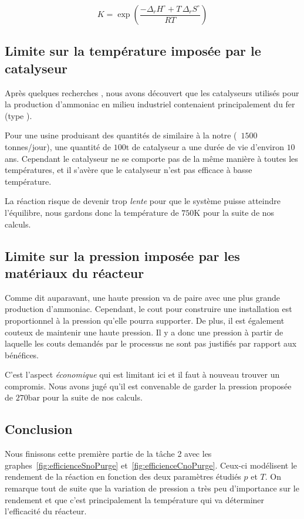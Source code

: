 \[
K = \exp{\left( \frac{- \Delta_r H^{\circ} + T \, \Delta_r S^{\circ}}{R T}\right)}
\]

\subsection{Limite sur la température imposée par le catalyseur}

Après quelques recherches \cite{catalyseur}, 
nous avons découvert que les catalyseurs utilisés
pour la production d'ammoniac en milieu industriel 
contenaient principalement du fer (type ). 

Pour une usine produisant des quantités de  similaire à la notre (~$1500$ tonnes/jour), 
une quantité de $100\si{\tonne}$ de catalyseur a une durée de vie d'environ $10$ ans. 
Cependant le catalyseur ne se comporte pas de la m\^eme manière à toutes les températures,
et il s'avère que le catalyseur n'est pas efficace à basse température. 

La réaction risque de devenir trop \emph{lente} pour que le système puisse
atteindre l'équilibre, nous gardons donc la température de $750\si{\kelvin}$
pour la suite de nos calculs.

\subsection{Limite sur la pression imposée par les matériaux du réacteur}

Comme dit auparavant, une haute pression va de paire avec une plus grande production d'ammoniac.
Cependant, le cout pour construire une installation est proportionnel 
à la pression qu'elle pourra supporter. 
De plus, il est également couteux de maintenir une haute pression. 
Il y a donc une pression à partir de laquelle les couts demandés 
par le processus ne sont pas justifiés par rapport aux bénéfices. 

C'est l'aspect \emph{économique} qui est limitant ici et il faut à nouveau trouver un compromis.
Nous avons jugé qu'il est convenable de garder la pression proposée de $270\si{\bar}$ 
pour la suite de nos calculs.

\subsection{Conclusion}

Nous finissons cette première partie de la t\^ache 2
avec les graphes~\ref{fig:efficienceSnoPurge} et~\ref{fig:efficienceCnoPurge}. 
Ceux-ci modélisent le rendement de la réaction en fonction des 
deux paramètres étudiés $p$ et $T$.
On remarque tout de suite que la variation de pression a très peu
d'importance sur le rendement et que c'est principalement
la température qui va déterminer l'efficacité du réacteur.

